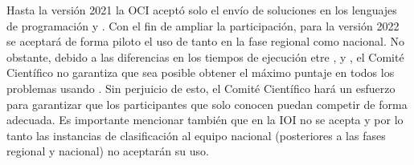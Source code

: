Hasta la versión 2021 la OCI aceptó solo el envío de soluciones en los lenguajes de programación \cpp y \java.
Con el fin de ampliar la participación, para la versión 2022 se aceptará de forma piloto el uso de \python
tanto en la fase regional como nacional.
No obstante, debido a las diferencias en los tiempos de ejecución etre \python, \cpp y \java, el Comité Científico
no garantiza que sea posible obtener el máximo puntaje en todos los problemas usando \python.
Sin perjuicio de esto, el Comité Científico hará un esfuerzo para garantizar que los participantes
que solo conocen \python puedan competir de forma adecuada.
Es importante mencionar también que en la IOI no se acepta \python y por lo tanto las instancias
de clasificación al equipo nacional (posteriores a las fases regional y nacional) no aceptarán su uso.
